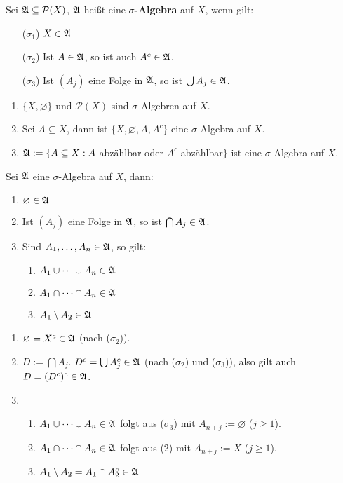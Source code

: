 \documentclass[a4paper,twoside,DIV15,BCOR12mm,chapterprefix=true,headings=onelinechapter]{scrbook}
\begin{document}
\begin{definition}
Sei $\mathfrak{A}\subseteq\mathcal{P}(X)$, $\mathfrak{A}$ heißt eine \textbf{$\sigma$-Algebra} auf $X$, wenn gilt:
\begin{enumerate}
\item[($\sigma_1$)] $X\in\mathfrak{A}$
\item[($\sigma_2$)] Ist $A\in\mathfrak{A}$, so ist auch $A^c\in\mathfrak{A}$.
\item[($\sigma_3$)] Ist $(A_j)$ eine Folge in $\mathfrak{A}$, so ist $\bigcup A_j\in\mathfrak{A}$.
\end{enumerate}
\end{definition}

\begin{beispiel}
\begin{enumerate}
\item $\{X,\varnothing\}$ und $\mathcal{P}(X)$ sind $\sigma$-Algebren auf $X$.
\item Sei $A\subseteq X$, dann ist $\{X,\varnothing, A, A^c\}$ eine $\sigma$-Algebra auf $X$.
\item $\mathfrak{A}:=\{A\subseteq X: A$ abzählbar oder $A^c$ abzählbar$\}$ ist eine $\sigma$-Algebra auf $X$.
\end{enumerate}
\end{beispiel}

\begin{lemma}
\label{Lemma 1.1}
Sei $\mathfrak{A}$ eine $\sigma$-Algebra auf $X$, dann:
\begin{enumerate}
\item $\varnothing\in\mathfrak{A}$
\item Ist $(A_j)$ eine Folge in $\mathfrak{A}$, so ist $\bigcap A_j\in\mathfrak{A}$.
\item Sind $A_1,\ldots,A_n\in\mathfrak{A}$, so gilt:
\begin{enumerate}
\item $A_1\cup\cdots\cup A_n\in\mathfrak{A}$
\item $A_1\cap\cdots\cap A_n\in\mathfrak{A}$
\item $A_1\setminus A_2\in\mathfrak{A}$
\end{enumerate}
\end{enumerate}
\end{lemma}

\begin{beweis}
\begin{enumerate}
\item $\varnothing=X^c\in\mathfrak{A}$ (nach ($\sigma_2$)).
\item $D:=\bigcap A_j$. $D^c=\bigcup A_j^c\in\mathfrak{A}$ (nach ($\sigma_2$) und ($\sigma_3$)), also gilt auch $D=(D^c)^c\in\mathfrak{A}$.
\item \begin{enumerate}
\item $A_1\cup\cdots\cup A_n\in\mathfrak{A}$ folgt aus ($\sigma_3$) mit $A_{n+j}:=\varnothing$ ($j\ge 1$).
\item $A_1\cap\cdots\cap A_n\in\mathfrak{A}$ folgt aus (2) mit $A_{n+j}:=X$ ($j\ge 1$).
\item $A_1\setminus A_2=A_1\cap A_2^c\in\mathfrak{A}$
\end{enumerate}
\end{enumerate}
\end{beweis}
\end{document}
